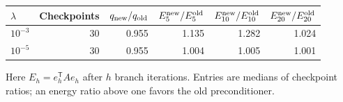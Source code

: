 \begin{center}
\small
\begin{tabular}{lrrrrr}
\hline
$\lambda$ & Checkpoints & $q_{\rm new}/q_{\rm old}$ & $E^{\rm new}_5/E^{\rm old}_5$ & $E^{\rm new}_{10}/E^{\rm old}_{10}$ & $E^{\rm new}_{20}/E^{\rm old}_{20}$ \\
\hline
$10^{-3}$ & 30 & 0.955 & 1.135 & 1.282 & 1.024 \\
$10^{-5}$ & 30 & 0.955 & 1.004 & 1.005 & 1.001 \\
\hline
\end{tabular}
\end{center}
Here $E_h=e_h^{\mathsf T}Ae_h$ after $h$ branch iterations. Entries are medians
of checkpoint ratios; an energy ratio above one favors the old preconditioner.
